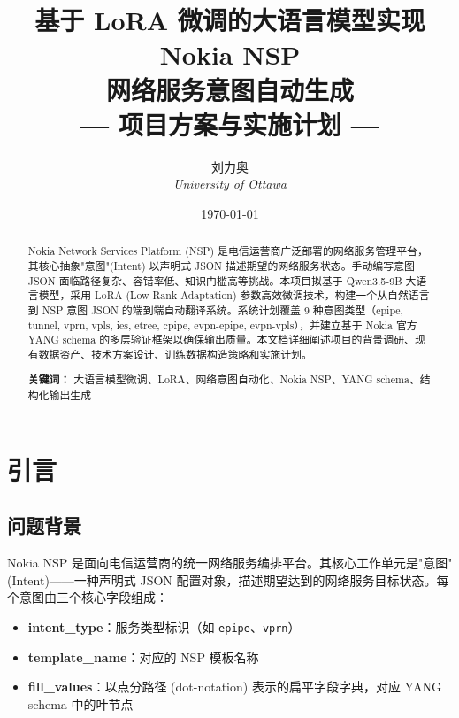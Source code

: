 \documentclass[12pt, a4paper]{article}
\title{%
  \vspace{-1cm}
  {\LARGE\bfseries 基于 LoRA 微调的大语言模型实现 Nokia NSP\\[4pt]
  网络服务意图自动生成}\\[12pt]
  {\large --- 项目方案与实施计划 ---}
}
\author{%
  刘力奥 \\[3pt]
  {\small\textit{University of Ottawa}}
}
\date{\today}
\newcommand{\intenttype}[1]{\texttt{#1}}
\newcommand{\yang}{\textsc{YANG}}
\newcommand{\nsp}{\textsc{NSP}}
\newcommand{\lora}{\textsc{LoRA}}
\begin{document}
\maketitle
\thispagestyle{empty}

\begin{abstract}
\noindent
Nokia Network Services Platform (\nsp{}) 是电信运营商广泛部署的网络服务管理平台，其核心抽象"意图"(Intent) 以声明式 JSON 描述期望的网络服务状态。手动编写意图 JSON 面临路径复杂、容错率低、知识门槛高等挑战。本项目拟基于 Qwen3.5-9B 大语言模型，采用 \lora{} (Low-Rank Adaptation) 参数高效微调技术，构建一个从自然语言到 \nsp{} 意图 JSON 的端到端自动翻译系统。系统计划覆盖 9 种意图类型（epipe, tunnel, vprn, vpls, ies, etree, cpipe, evpn-epipe, evpn-vpls），并建立基于 Nokia 官方 \yang{} schema 的多层验证框架以确保输出质量。本文档详细阐述项目的背景调研、现有数据资产、技术方案设计、训练数据构造策略和实施计划。

\vspace{6pt}
\noindent\textbf{关键词：} 大语言模型微调、LoRA、网络意图自动化、Nokia NSP、YANG schema、结构化输出生成
\end{abstract}

\newpage
\tableofcontents
\newpage

\section{引言}

\subsection{问题背景}

Nokia \nsp{} 是面向电信运营商的统一网络服务编排平台。其核心工作单元是"意图" (Intent)——一种声明式 JSON 配置对象，描述期望达到的网络服务目标状态。每个意图由三个核心字段组成：

\begin{itemize}
  \item \textbf{intent\_type}：服务类型标识（如 \intenttype{epipe}、\intenttype{vprn}）
  \item \textbf{template\_name}：对应的 \nsp{} 模板名称
  \item \textbf{fill\_values}：以点分路径 (dot-notation) 表示的扁平字段字典，对应 \yang{} schema 中的叶节点
\end{itemize}
\end{document}
